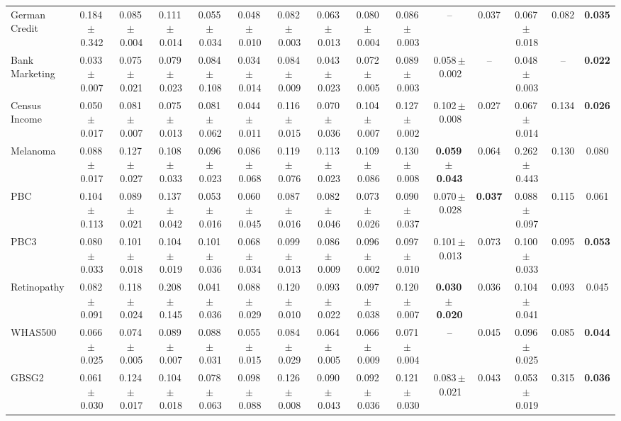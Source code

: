 \documentclass[8pt]{extarticle}
\begin{document}
\begin{longtable}{l*{14}{c}}
German Credit & 0.184\,$\pm$\,0.342 & 0.085\,$\pm$\,0.004 & 0.111\,$\pm$\,0.014 & 0.055\,$\pm$\,0.034 & 0.048\,$\pm$\,0.010 & 0.082\,$\pm$\,0.003 & 0.063\,$\pm$\,0.013 & 0.080\,$\pm$\,0.004 & 0.086\,$\pm$\,0.003 & -- & 0.037 & 0.067\,$\pm$\,0.018 & 0.082 & \textbf{0.035} \\
Bank Marketing & 0.033\,$\pm$\,0.007 & 0.075\,$\pm$\,0.021 & 0.079\,$\pm$\,0.023 & 0.084\,$\pm$\,0.108 & 0.034\,$\pm$\,0.014 & 0.084\,$\pm$\,0.009 & 0.043\,$\pm$\,0.023 & 0.072\,$\pm$\,0.005 & 0.089\,$\pm$\,0.003 & 0.058\,$\pm$\,0.002 & -- & 0.048\,$\pm$\,0.003 & -- & \textbf{0.022} \\
Census Income & 0.050\,$\pm$\,0.017 & 0.081\,$\pm$\,0.007 & 0.075\,$\pm$\,0.013 & 0.081\,$\pm$\,0.062 & 0.044\,$\pm$\,0.011 & 0.116\,$\pm$\,0.015 & 0.070\,$\pm$\,0.036 & 0.104\,$\pm$\,0.007 & 0.127\,$\pm$\,0.002 & 0.102\,$\pm$\,0.008 & 0.027 & 0.067\,$\pm$\,0.014 & 0.134 & \textbf{0.026} \\
Melanoma & 0.088\,$\pm$\,0.017 & 0.127\,$\pm$\,0.027 & 0.108\,$\pm$\,0.033 & 0.096\,$\pm$\,0.023 & 0.086\,$\pm$\,0.068 & 0.119\,$\pm$\,0.076 & 0.113\,$\pm$\,0.023 & 0.109\,$\pm$\,0.086 & 0.130\,$\pm$\,0.008 & \textbf{0.059\,$\pm$\,0.043} & 0.064 & 0.262\,$\pm$\,0.443 & 0.130 & 0.080 \\
PBC & 0.104\,$\pm$\,0.113 & 0.089\,$\pm$\,0.021 & 0.137\,$\pm$\,0.042 & 0.053\,$\pm$\,0.016 & 0.060\,$\pm$\,0.045 & 0.087\,$\pm$\,0.016 & 0.082\,$\pm$\,0.046 & 0.073\,$\pm$\,0.026 & 0.090\,$\pm$\,0.037 & 0.070\,$\pm$\,0.028 & \textbf{0.037} & 0.088\,$\pm$\,0.097 & 0.115 & 0.061 \\
PBC3 & 0.080\,$\pm$\,0.033 & 0.101\,$\pm$\,0.018 & 0.104\,$\pm$\,0.019 & 0.101\,$\pm$\,0.036 & 0.068\,$\pm$\,0.034 & 0.099\,$\pm$\,0.013 & 0.086\,$\pm$\,0.009 & 0.096\,$\pm$\,0.002 & 0.097\,$\pm$\,0.010 & 0.101\,$\pm$\,0.013 & 0.073 & 0.100\,$\pm$\,0.033 & 0.095 & \textbf{0.053} \\
Retinopathy & 0.082\,$\pm$\,0.091 & 0.118\,$\pm$\,0.024 & 0.208\,$\pm$\,0.145 & 0.041\,$\pm$\,0.036 & 0.088\,$\pm$\,0.029 & 0.120\,$\pm$\,0.010 & 0.093\,$\pm$\,0.022 & 0.097\,$\pm$\,0.038 & 0.120\,$\pm$\,0.007 & \textbf{0.030\,$\pm$\,0.020} & 0.036 & 0.104\,$\pm$\,0.041 & 0.093 & 0.045 \\
WHAS500 & 0.066\,$\pm$\,0.025 & 0.074\,$\pm$\,0.005 & 0.089\,$\pm$\,0.007 & 0.088\,$\pm$\,0.031 & 0.055\,$\pm$\,0.015 & 0.084\,$\pm$\,0.029 & 0.064\,$\pm$\,0.005 & 0.066\,$\pm$\,0.009 & 0.071\,$\pm$\,0.004 & -- & 0.045 & 0.096\,$\pm$\,0.025 & 0.085 & \textbf{0.044} \\
GBSG2 & 0.061\,$\pm$\,0.030 & 0.124\,$\pm$\,0.017 & 0.104\,$\pm$\,0.018 & 0.078\,$\pm$\,0.063 & 0.098\,$\pm$\,0.088 & 0.126\,$\pm$\,0.008 & 0.090\,$\pm$\,0.043 & 0.092\,$\pm$\,0.036 & 0.121\,$\pm$\,0.030 & 0.083\,$\pm$\,0.021 & 0.043 & 0.053\,$\pm$\,0.019 & 0.315 & \textbf{0.036} \\

\end{longtable}
\end{document}
